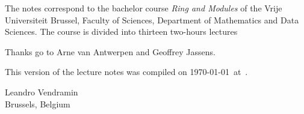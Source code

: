 \preface

The notes correspond to the bachelor 
course \emph{Ring and Modules} of the 
Vrije Universiteit Brussel, 
Faculty of Sciences, 
Department of Mathematics and Data Sciences.  The course
is divided into thirteen two-hours lectures 

Thanks go to Arne van Antwerpen and Geoffrey Jassens. 

This version of the lecture notes 
was compiled on \today~at~\currenttime.

\begin{flushright}
Leandro Vendramin\\Brussels, Belgium\par
\end{flushright}